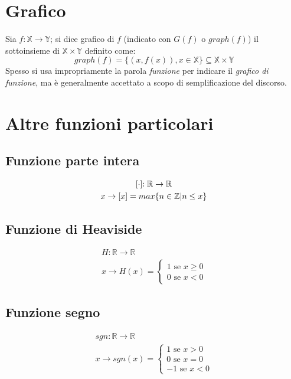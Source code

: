 \section{Grafico}
Sia $f: \mathbb{X} \rightarrow \mathbb{Y}$; si dice grafico di $f$ (indicato con $G(f)$ o $graph(f)$) il sottoinsieme di $\mathbb{X}\times\mathbb{Y}$ definito come:
\begin{equation*}
graph(f)=\{(x,f(x)), x \in \mathbb{X}\} \subseteq \mathbb{X}\times\mathbb{Y}
\end{equation*}
Spesso si usa impropriamente la parola \textit{funzione} per indicare il \textit{grafico di funzione}, ma è generalmente accettato a scopo di semplificazione del discorso.

\section{Altre funzioni particolari}
\subsection{Funzione parte intera}
\begin{equation}
\begin{gathered}
$[$\cdot$]$: \mathbb{R} \rightarrow \mathbb{R}\\
x \rightarrow [x] = max\{n \in \mathbb{Z} | n\leq x\}
\end{gathered}
\end{equation}

\subsection{Funzione di Heaviside}
\begin{equation}
\begin{gathered}
H: \mathbb{R} \rightarrow \mathbb{R}\\
x \rightarrow H(x) =
\begin{cases}
1 \text{  se } x \geq 0\\
0 \text{  se } x < 0
\end{cases}
\end{gathered}
\end{equation}

\subsection{Funzione segno}
\begin{equation}
\begin{gathered}
sgn: \mathbb{R} \rightarrow \mathbb{R}\\
x \rightarrow sgn(x) =
\begin{cases}
1 \text{ se } x > 0\\
0 \text{ se } x = 0\\
-1 \text{ se } x < 0
\end{cases}
\end{gathered}
\end{equation}

